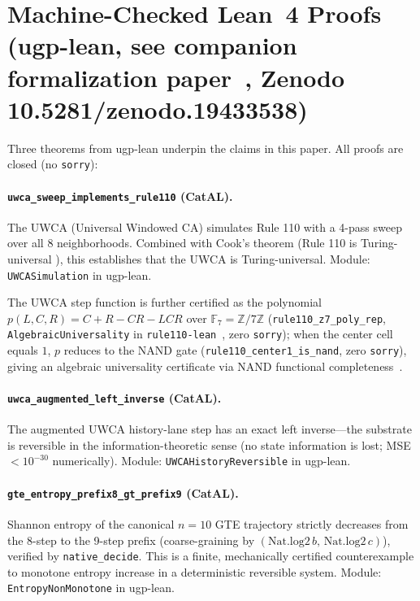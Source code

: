 \documentclass[11pt]{article}
\begin{document}
\section{Machine-Checked Lean~4 Proofs (ugp-lean, see companion formalization paper~\cite{SpivackUGPFormalization}, Zenodo 10.5281/zenodo.19433538)}
\label{app:lean}

Three theorems from ugp-lean \cite{ugp-lean} underpin the claims in this paper. All proofs are closed (no \texttt{sorry}):

\paragraph{\texttt{uwca\_sweep\_implements\_rule110} (CatAL).}
The UWCA (Universal Windowed CA) simulates Rule 110 with a 4-pass sweep over all 8 neighborhoods. Combined with Cook's theorem (Rule 110 is Turing-universal \cite{Cook2004}), this establishes that the UWCA is Turing-universal.
Module: \texttt{UWCASimulation} in ugp-lean.

The UWCA step function is further certified as the polynomial $p(L,C,R) = C+R-CR-LCR$ over $\mathbb{F}_7 = \mathbb{Z}/7\mathbb{Z}$ (\texttt{rule110\_z7\_poly\_rep}, \texttt{AlgebraicUniversality} in \texttt{rule110-lean}~\cite{rule110-lean}, zero \texttt{sorry}); when the center cell equals $1$, $p$ reduces to the NAND gate (\texttt{rule110\_center1\_is\_nand}, zero \texttt{sorry}), giving an algebraic universality certificate via NAND functional completeness~\cite{Sheffer1913}.

\paragraph{\texttt{uwca\_augmented\_left\_inverse} (CatAL).}
The augmented UWCA history-lane step has an exact left inverse---the substrate is reversible in the information-theoretic sense (no state information is lost; MSE $< 10^{-30}$ numerically).
Module: \texttt{UWCAHistoryReversible} in ugp-lean.

\paragraph{\texttt{gte\_entropy\_prefix8\_gt\_prefix9} (CatAL).}
Shannon entropy of the canonical $n=10$ GTE trajectory strictly decreases from the 8-step to the 9-step prefix (coarse-graining by $(\mathrm{Nat.log2}\,b,\,\mathrm{Nat.log2}\,c)$), verified by \texttt{native\_decide}. This is a finite, mechanically certified counterexample to monotone entropy increase in a deterministic reversible system.
Module: \texttt{EntropyNonMonotone} in ugp-lean.
\end{document}
